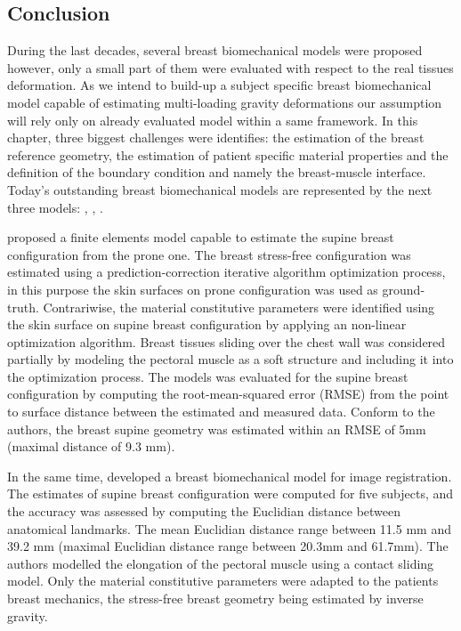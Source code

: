  \subsection{Conclusion}
 
 During the last decades, several breast biomechanical models were proposed however, only a small part of them \citep{carter_biomechanical_2009,gamage_modelling_2012,han_nonlinear_2014} were evaluated with respect to the real tissues deformation. As we intend to build-up a subject specific breast biomechanical model capable of estimating multi-loading gravity deformations our assumption will rely only on already evaluated model within a same framework. In this chapter, three biggest challenges were identifies:  the estimation of the breast reference geometry, the estimation of patient specific material properties and the definition of the boundary condition and namely the breast-muscle interface. Today's outstanding breast biomechanical models are represented by the next three models:   \cite{eiben_surface_2016}, \cite{han_nonlinear_2014}, \cite{gamage_modelling_2012}.   

 \cite{gamage_modelling_2012} proposed a finite elements model capable to estimate the supine breast configuration from the prone one. The breast stress-free configuration was estimated using a prediction-correction iterative algorithm optimization process, in this purpose the skin surfaces on prone configuration was used as ground-truth. Contrariwise, the material constitutive parameters were identified using the skin surface on supine breast configuration by applying an non-linear optimization algorithm. Breast tissues sliding over the chest wall was considered partially by modeling the pectoral muscle as a soft structure and including it into the optimization process. The models was evaluated for the supine breast configuration by computing the root-mean-squared error (RMSE) from the point to surface distance between the estimated and measured data. Conform to the authors, the breast supine geometry was estimated within an RMSE of 5mm (maximal distance of 9.3 mm). 

In the same time, \cite{han_nonlinear_2014} developed a breast biomechanical model for image registration. The estimates of supine breast configuration  were computed for five subjects, and the accuracy was assessed by computing the Euclidian distance between anatomical landmarks.  The mean Euclidian distance range between 11.5 mm and 39.2 mm (maximal Euclidian distance range between 20.3mm and 61.7mm). The authors modelled the elongation of the pectoral muscle using a contact sliding model. Only the material constitutive parameters were adapted to the patients breast mechanics, the stress-free breast geometry being estimated by inverse gravity. 

